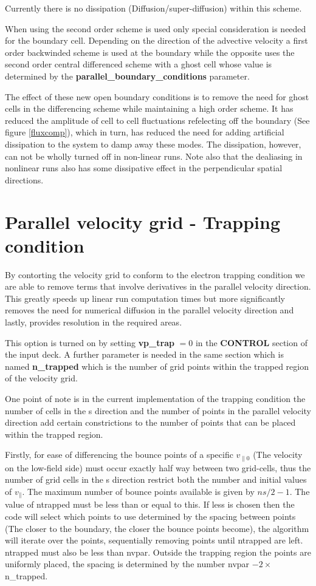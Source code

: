 \documentclass{report}
\begin{document}
\noindent
Currently there is no dissipation (Diffusion/super-diffusion) within this scheme.


When using the second order scheme is used only special consideration is needed for the boundary cell.  Depending on the direction of the advective velocity a first order backwinded scheme is used at the boundary while the opposite uses the second order central differenced scheme with a ghost cell whose value is determined by the \textbf{parallel\_boundary\_conditions} parameter. 

The effect of these new open boundary conditions is to remove the need for ghost cells in the differencing scheme while maintaining a high order scheme. It has reduced the amplitude of cell to cell fluctuations refelecting off the boundary (See figure \ref{fluxcomp}), which in turn, has reduced the need for adding artificial dissipation to the system to damp away these modes.  The dissipation, however, can not be wholly turned off in non-linear runs.  Note also that the dealiasing in nonlinear runs also has some dissipative effect in the perpendicular spatial directions.

\section{Parallel velocity grid - Trapping condition}%
By contorting the velocity grid to conform to the electron trapping condition we are able to remove terms that involve derivatives in the parallel velocity direction.  This greatly speeds up linear run computation times but more significantly removes the need for numerical diffusion in the parallel velocity direction and lastly, provides resolution in the required areas.

This option is turned on by setting \textbf{vp\_trap} $= 0$ in the \textbf{CONTROL} section of the input deck.  A further parameter is needed in the same section which is named \textbf{n\_trapped} which is the number of grid points within the trapped region of the velocity grid.

One point of note is in the current implementation of the trapping condition the number of cells in the s direction and the number of points in the parallel velocity direction add certain constrictions to the number of points that can be placed within the trapped region.

Firstly, for ease of differencing the bounce points of a specific $v_{\parallel 0}$ (The velocity on the low-field side) must occur exactly half way between two grid-cells, thus the number of grid cells in the s direction restrict both the number and initial values of $v_{\parallel}$.  The maximum number of bounce points available is given by $ns/2 - 1$.  The value of ntrapped must be less than or equal to this.  If less is chosen then the code will select which points to use determined by the spacing between points (The closer to the boundary, the closer the bounce points become), the algorithm will iterate over the points, sequentially removing points until ntrapped are left.  ntrapped must also be less than nvpar.  Outside the trapping region the points are uniformly placed, the spacing is determined by the number nvpar $- 2\times$n\_trapped.
\end{document}
